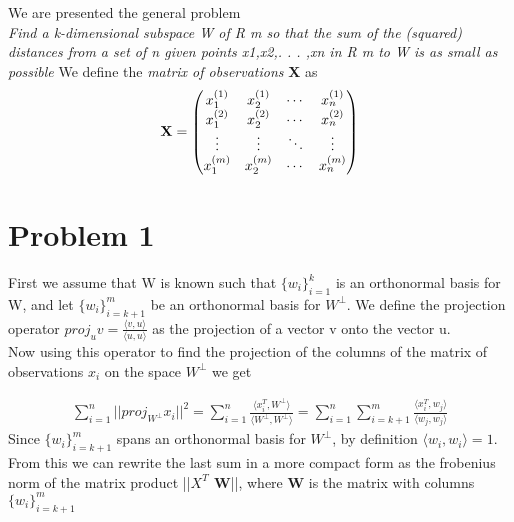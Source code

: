 \documentclass[a4paper,norsk]{article}
\begin{document}
\maketitle

We are presented the general problem \\
\textit{Find a k-dimensional subspace W of R m so that the sum of the (squared) distances from a set of n given points x1,x2,. . . ,xn in R m to W is as small as possible}
We define the \textit{matrix of observations} \textbf{X} as \\

\begin{align*}
	\text{\textbf{X}} = 
 \begin{pmatrix}
  x_{1}^{(1)} & x_{2}^{(1)} & \cdots & x_{n}^{(1)} \\
  x_{1}^{(2)} & x_{2}^{(2)} & \cdots & x_{n}^{(2)} \\
  \vdots  & \vdots  & \ddots & \vdots  \\
  x_{1}^{(m)} & x_{2}^{(m)} & \cdots & x_{n}^{(m)}
 \end{pmatrix}
\end{align*}

\section{Problem 1}
First we assume that W is known such that $\{w_i\}_{i=1}^{k}$ is an orthonormal basis for W, and let $\{w_i\}_{i=k+1}^{m}$
be an orthonormal basis for $W^{\perp}$. We define the projection operator 
$proj_u v = \frac{\langle v , u\rangle}{\langle u, u \rangle}$ as the projection of a vector v onto the vector u. \\
Now using this operator to find the projection of the columns of the matrix of observations $x_i$ on the space $W^\perp$ we get 

\begin{align*}
\sum_{i=1}^n ||proj_{W^\perp} x_i||^2 = \sum_{i=1}^n \frac{\langle x_i^T , W^\perp \rangle}{\langle W^\perp, W^\perp \rangle} = 
\sum_{i=1}^n \sum_{i=k+1}^m \frac{\langle x_i^T , w_j \rangle}{\langle w_j, w_j \rangle}
\end{align*}
Since $\{w_i\}_{i=k+1}^{m}$ spans an orthonormal basis for $W^\perp$, by definition $\langle w_i, w_i \rangle = 1$.
From this we can  rewrite the last sum in a more compact form 
as the frobenius norm of the matrix product ||\textbf{$X^T$ W}||, where \textbf{W} is 
the matrix with columns  $\{w_i\}_{i=k+1}^{m}$
\newpage
\end{document}
